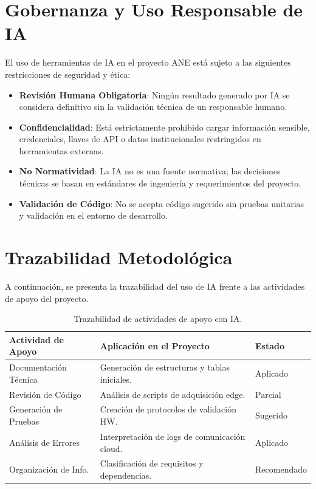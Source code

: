 \section{Gobernanza y Uso Responsable de IA}
El uso de herramientas de IA en el proyecto ANE está sujeto a las siguientes restricciones de seguridad y ética:
\begin{itemize}
    \item \textbf{Revisión Humana Obligatoria}: Ningún resultado generado por IA se considera definitivo sin la validación técnica de un responsable humano.
    \item \textbf{Confidencialidad}: Está estrictamente prohibido cargar información sensible, credenciales, llaves de API o datos institucionales restringidos en herramientas externas.
    \item \textbf{No Normatividad}: La IA no es una fuente normativa; las decisiones técnicas se basan en estándares de ingeniería y requerimientos del proyecto.
    \item \textbf{Validación de Código}: No se acepta código sugerido sin pruebas unitarias y validación en el entorno de desarrollo.
\end{itemize}

\section{Trazabilidad Metodológica}
A continuación, se presenta la trazabilidad del uso de IA frente a las actividades de apoyo del proyecto.

\begin{table}[H]
\centering
\caption{Trazabilidad de actividades de apoyo con IA.}
\label{tab:ai_traceability}
\begin{tabularx}{\textwidth}{@{}l X l@{}}
\toprule
Actividad de Apoyo & Aplicación en el Proyecto & Estado \\
\midrule
Documentación Técnica & Generación de estructuras y tablas iniciales. & Aplicado \\
Revisión de Código & Análisis de scripts de adquisición edge. & Parcial \\
Generación de Pruebas & Creación de protocolos de validación HW. & Sugerido \\
Análisis de Errores & Interpretación de logs de comunicación cloud. & Aplicado \\
Organización de Info. & Clasificación de requisitos y dependencias. & Recomendado \\
\bottomrule
\end{tabularx}
\end{table}

